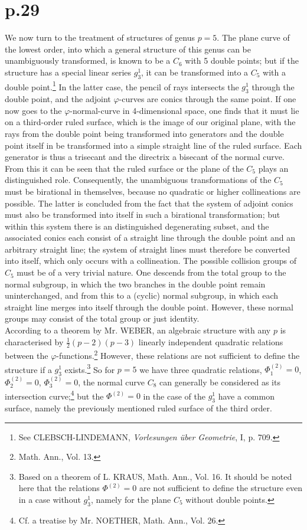 \documentclass[leqno]{article}
\begin{document}
\section{p.29}
We now turn to the treatment of structures of genus $p=5$. The plane curve of the lowest order, into which a general structure of this genus can be unambiguously transformed, is known to be a $C_6$ with 5 double points; but if the structure has a special linear series $g_3^1$, it can be transformed into a $C_5$ with a double point.\footnote{See CLEBSCH-LINDEMANN, \textit{Vorlesungen \"uber Geometrie}, I, p. 709.} In the latter case, the pencil of rays intersects the $g_3^1$ through the double point, and the adjoint $\varphi$-curves are conics through the same point. If one now goes to the $\varphi$-normal-curve in 4-dimensional space, one finds that it must lie on a third-order ruled surface, which is the image of our original plane, with the rays from the double point being transformed into generators and the double point itself in be transformed into a simple straight line of the ruled surface. Each generator is thus a trisecant and the directrix a bisecant of the normal curve. From this it can be seen that the ruled surface or the plane of the $C_5$ plays an distinguished role. Consequently, the unambiguous transformations of the $C_5$ must be birational in themselves, because no quadratic or higher collineations are possible. The latter is concluded from the fact that the system of adjoint conics must also be transformed into itself in such a birational transformation; but within this system there is an distinguished degenerating subset, and the associated conics each consist of a straight line through the double point and an arbitrary straight line; the system of straight lines must therefore be converted into itself, which only occurs with a collineation. The possible collision groups of $C_5$ must be of a very trivial nature. One descends from the total group to the normal subgroup, in which the two branches in the double point remain uninterchanged, and from this to a (cyclic) normal subgroup, in which each straight line merges into itself through the double point. However, these normal groups may consist of the total group or just identity. \\
According to a theorem by Mr. WEBER, an algebraic structure with any $p$ is characterised by $\frac{1}{2}(p-2)(p-3)$ linearly independent quadratic relations between the $\varphi$-functions.\footnote{Math. Ann., Vol. 13.} However, these relations are not sufficient to define the structure if a $g_3^1$ exists.\footnote{Based on a theorem of L. KRAUS, Math. Ann., Vol. 16. It should be noted here that the relations $\Phi^{(2)}=0$ are not sufficient to define the structure even in a case without $g_3^1$, namely for the plane $C_5$ without double points.} So for $p=5$ we have three quadratic relations, $\Phi_1^{(2)}=0$, $\Phi_2^{(2)}=0$, $\Phi_3^{(2)}=0 $, the normal curve $C_8$ can generally be considered as its intersection curve;\footnote{Cf. a treatise by Mr. NOETHER, Math. Ann., Vol. 26.} but the $\Phi^{(2)}=0$ in the case of the $g_3^1$ have a common surface, namely the previously mentioned ruled surface of the third order.
\end{document}
